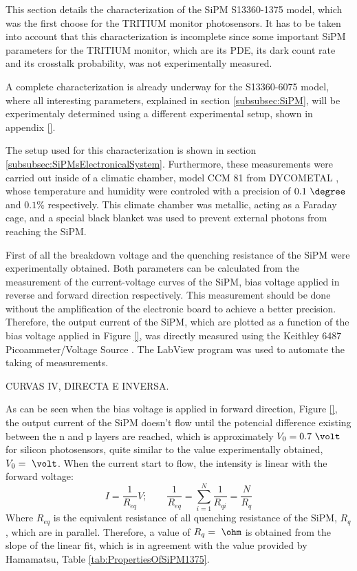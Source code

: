 This section details the characterization of the SiPM S13360-1375 model, which was the first choose for the TRITIUM monitor photosensors. It has to be taken into account that this characterization is incomplete since some important SiPM parameters for the TRITIUM monitor, which are its PDE, its dark count rate and its crosstalk probability, was not experimentally measured. 

A complete characterization is already underway for the S13360-6075 model, where all interesting parameters, explained in section \ref{subsubsec:SiPM}, will be experimentaly determined using a different experimental setup, shown in appendix \ref{}.

The setup used for this characterization is shown in section \ref{subsubsec:SiPMsElectronicalSystem}. Furthermore, these measurements were carried out inside of a climatic chamber, model CCM 81 from DYCOMETAL \cite{ClimaticChamberIFIMED}, whose temperature and humidity were controled with a precision of $0.1~\degree$ and $0.1\%$ respectively. This climate chamber was metallic, acting as a Faraday cage, and a special black blanket \cite{BlackBlancket} was used to prevent external photons from reaching the SiPM.

First of all the breakdown voltage and the quenching resistance of the SiPM were experimentally obtained. Both parameters can be calculated from the measurement of the current-voltage curves of the SiPM, bias voltage applied in reverse and forward direction respectively. This measurement should be done without the amplification of the electronic board to achieve a better precision. Therefore, the output current of the SiPM, which are plotted as a function of the bias voltage applied in Figure \ref{},  was directly measured using the Keithley 6487 Picoammeter/Voltage Source \cite{DataSheetKeithley6487}. The LabView program was used to automate the taking of measurements.

CURVAS IV, DIRECTA E INVERSA.

As can be seen when the bias voltage is applied in forward direction, Figure \ref{}, the output current of the SiPM doesn't flow until the potencial difference existing between the n and p layers are reached, which is approximately $V_0=0.7~\volt$ for silicon photosensors, quite similar to the value experimentally obtained, $V_0= ~\volt$. When the current start to flow, the intensity is linear with the forward voltage:
\begin{equation}
I=\frac{1}{R_{eq}}V;  \qquad \frac{1}{R_{eq}} = \sum_{i=1}^{N}\frac{1}{R_{qi}}= \frac{N}{R_{q}}
\label{QuenchingResistance}
\end{equation}
Where $R_{eq}$ is the equivalent resistance of all quenching resistance of the SiPM, $R_{q}$, which are in parallel. Therefore, a value of $R_{q}= ~\ohm$ is obtained from the slope of the linear fit, which is in agreement with the value provided by Hamamatsu, Table \ref{tab:PropertiesOfSiPM1375}.

